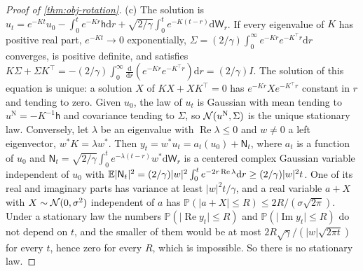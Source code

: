 \begin{proof}[Proof of \cref{thm:obj-rotation}]
(c) The solution is $u_t=e^{-Kt}u_0-\int_0^te^{-Kr}\mathsf h\mathrm dr+\sqrt{2/\gamma}\int_0^te^{-K(t-r)}\mathrm d\mathsf W_r$. If every eigenvalue of $K$ has positive real part, $e^{-Kt}\to0$ exponentially, $\Sigma=(2/\gamma)\int_0^\infty e^{-Kr}e^{-K^\top r}\mathrm dr$ converges, is positive definite, and satisfies $K\Sigma+\Sigma K^\top=-(2/\gamma)\int_0^\infty\frac{\mathrm d}{\mathrm dr}(e^{-Kr}e^{-K^\top r})\mathrm dr=(2/\gamma)I$. The solution of this equation is unique: a solution $X$ of $KX+XK^\top=0$ has $e^{-Kr}Xe^{-K^\top r}$ constant in $r$ and tending to zero. Given $u_0$, the law of $u_t$ is Gaussian with mean tending to $u^{\mathrm N}=-K^{-1}\mathsf h$ and covariance tending to $\Sigma$, so $\mathcal{N}(u^{\mathrm N},\Sigma)$ is the unique stationary law. Conversely, let $\lambda$ be an eigenvalue with $\operatorname{Re}\lambda\le0$ and $w\neq0$ a left eigenvector, $w^\ast K=\lambda w^\ast$. Then $y_t=w^\ast u_t=a_t(u_0)+\mathsf N_t$, where $a_t$ is a function of $u_0$ and $\mathsf N_t=\sqrt{2/\gamma}\int_0^te^{-\lambda(t-r)}w^\ast\mathrm d\mathsf W_r$ is a centered complex Gaussian variable independent of $u_0$ with $\mathbb{E}\lvert\mathsf N_t\rvert^2=(2/\gamma)\lvert w\rvert^2\int_0^te^{-2r\operatorname{Re}\lambda}\mathrm dr\ge(2/\gamma)\lvert w\rvert^2t$. One of its real and imaginary parts has variance at least $\lvert w\rvert^2t/\gamma$, and a real variable $a+X$ with $X\sim\mathcal{N}(0,\sigma^2)$ independent of $a$ has $\mathbb P(\lvert a+X\rvert\le R)\le2R/(\sigma\sqrt{2\pi})$. Under a stationary law the numbers $\mathbb P(\lvert\operatorname{Re}y_t\rvert\le R)$ and $\mathbb P(\lvert\operatorname{Im}y_t\rvert\le R)$ do not depend on $t$, and the smaller of them would be at most $2R\sqrt{\gamma}/(\lvert w\rvert\sqrt{2\pi t})$ for every $t$, hence zero for every $R$, which is impossible. So there is no stationary law.


\end{proof}
